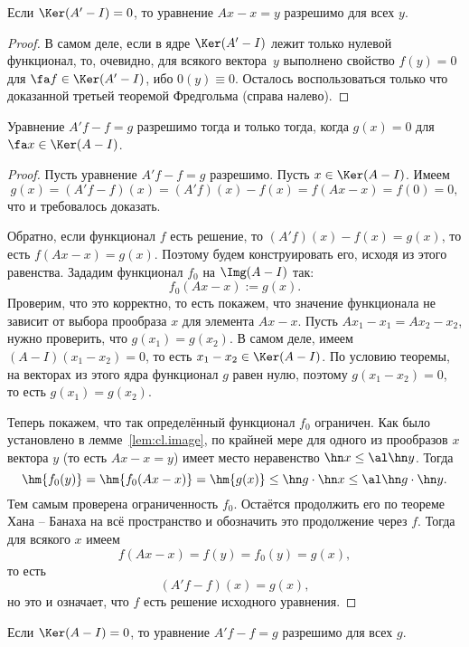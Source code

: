 \documentclass[a4paper]{article}
\begin{document}
\begin{imp}
Если $\Ker(A'-I) = 0$, то уравнение $Ax - x = y$ разрешимо для всех $y$.
\end{imp}
\begin{proof}
В самом деле, если в ядре $\Ker(A'-I)$ лежит только нулевой функционал, то, очевидно, для
всякого вектора~$y$ выполнено свойство $f(y) = 0$ для $\fa f \in \Ker(A'-I)$, ибо $0(y) \equiv 0$.
Осталось воспользоваться только что доказанной третьей теоремой Фредгольма (справа налево).
\end{proof}

\begin{theorem}
Уравнение $A'f-f = g$ разрешимо тогда и только тогда, когда $g(x) = 0$ для $\fa x \in \Ker(A-I)$.
\end{theorem}
\begin{proof}
Пусть уравнение $A'f-f = g$ разрешимо. Пусть $x \in \Ker(A - I)$.
Имеем
$$g(x) = (A'f-f)(x) = (A'f)(x) - f(x) = f(Ax-x) = f(0) = 0,$$
что и требовалось доказать.

Обратно, если функционал $f$ есть решение, то $(A'f)(x) - f(x) = g(x)$, то есть $f(Ax-x) = g(x)$.
Поэтому будем конструировать его, исходя из этого равенства.
Зададим функционал $f_0$ на $\Img(A - I)$ так:
$$f_0(Ax-x) := g(x).$$
Проверим, что это корректно, то есть покажем, что значение функционала не зависит от выбора
прообраза $x$ для элемента $Ax - x$. Пусть $Ax_1 - x_1 = Ax_2 - x_2$, нужно
проверить, что $g(x_1) = g(x_2)$. В самом деле,
имеем $(A-I)(x_1-x_2) = 0$, то есть $x_1 - x_2 \in \Ker(A-I)$. По условию теоремы, на
векторах из этого ядра функционал $g$ равен нулю, поэтому $g(x_1 - x_2) = 0$,
то есть $g(x_1) = g(x_2)$.

Теперь покажем, что так определённый функционал $f_0$ ограничен.
Как было установлено в лемме~\ref{lem:cl.image}, по крайней мере для
одного из прообразов $x$ вектора $y$ (то есть $Ax - x = y$) имеет место неравенство $\hn x \le \al \hn y$.
Тогда
$$\hm{f_0(y)} = \hm{f_0(Ax-x)} = \hm{g(x)} \le \hn g \cdot \hn x \le  \al \hn g\cdot\hn y.$$
Тем самым проверена ограниченность $f_0$. Остаётся продолжить его по теореме Хана -- Банаха
на всё пространство и обозначить это продолжение через $f$. Тогда для всякого $x$ имеем
$$f(Ax -x) = f(y) = f_0(y) = g(x),$$
то есть
$$(A'f-f)(x) = g(x),$$
но  это и означает, что $f$ есть решение исходного уравнения.
\end{proof}

\begin{imp}
Если $\Ker(A-I) = 0$, то уравнение $A'f - f = g$ разрешимо для всех $g$.
\end{imp}
\end{document}
